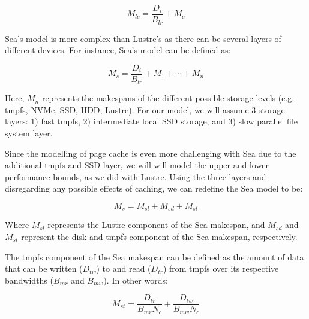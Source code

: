 \documentclass{report}
\begin{document}
    \begin{equation}\label{eq:lustrepc}
        M_{lc} = \frac{D_{i}}{B_{lr}} + M_{c}
    \end{equation}


    Sea's model is more complex than Lustre's as there can be several
    layers of different devices. For instance, Sea's model can be defined as:

    \begin{equation}\label{eq:sea}
        M_{s} = \frac{D_{i}}{B_{lr}} + M_{1} + \cdots + M_{n}
    \end{equation}

    Here, $M_{n}$ represents the makespans of the different possible storage levels
    (e.g. tmpfs, NVMe, SSD, HDD, Lustre). For our model, we will assume 3 storage layers:
    1) fast tmpfs, 2) intermediate local SSD storage, and 3) slow parallel file system layer.
    
    Since the modelling of page cache is even more challenging with Sea due to the additional tmpfs
    and SSD layer, we will will model the upper and lower performance bounds, as we did with Lustre.
    Using the three layers and disregarding any possible effects of caching, we can redefine the
    Sea model to be:

    \begin{equation}\label{eq:snc}
        M_{s} = M_{sl} + M_{sd} + M_{st}
    \end{equation}

    Where $M_{sl}$ represents the Lustre component of the Sea makespan, and
    $M_{sd}$ and $M_{st}$ represent the disk and tmpfs component of the Sea
    makespan, respectively.

    The tmpfs component of the Sea makespan can be defined as the amount of
    data that can be written ($D_{tw}$) to and read ($D_{tr}$) from tmpfs
    over its respective bandwidths ($B_{mr}$ and $B_{mw}$). In other words:

    \begin{equation}\label{eq:mst}
        M_{st} = \frac{D_{tr}}{B_{mr}N_{c}} + \frac{D_{tw}}{B_{mw}N_{c}}
    \end{equation}
\end{document}
